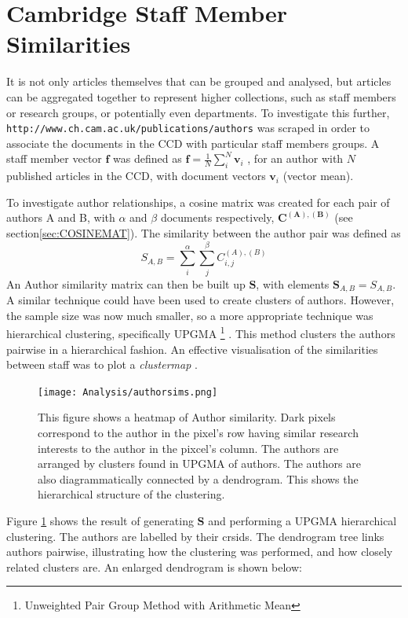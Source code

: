 \section{Cambridge Staff Member Similarities}
It is not only articles themselves that can be grouped and analysed, but articles can be aggregated together to represent higher collections, such as staff members or research groups, or potentially even departments. 
To investigate this further, \texttt{http://www.ch.cam.ac.uk/publications/authors} was scraped in order to associate the documents in the CCD with particular staff members groups. A staff member vector $\textbf{f}$ was defined as $\mathbf{f}=\frac{1}{N}\sum_{i}^{N} \mathbf{v}_i$ , for an author with $N$ published articles in the CCD, with document vectors $\mathbf{v}_i$ (vector mean).

To investigate author relationships, a cosine matrix was created for each pair of authors A and B, with $\alpha$ and $\beta$ documents respectively, $\mathbf{C^{\left( A \right ) , \left( B \right)}}$ (see section\ref{sec:COSINEMAT}). The similarity between the author pair was defined as 
$$S_{A , B} = \sum_{i}^{\alpha} \sum_{j}^{\beta} C^{\left( A \right) , \left( B \right) }_{ i , j }$$
An Author similarity matrix can then be built up $\mathbf{S}$, with elements $\mathbf{S}_{ A , B }=S_{ A , B }$.
A similar technique could have been used to create clusters of authors. However, the sample size was now much smaller, so a more appropriate technique was hierarchical clustering, specifically UPGMA \footnote{Unweighted Pair Group Method with Arithmetic Mean} \cite{heatmapcluster}. This method clusters the authors pairwise in a hierarchical fashion.  An effective visualisation of the similarities between staff was to plot a \emph{clustermap} \cite{seaborn} \cite{scipy}.
\begin{center}
\begin{figure}[H]
\label{fig:AUTHORSIMS}
  \centering
    \texttt{[image: Analysis/authorsims.png]}
    \caption{This figure shows a heatmap of Author similarity. Dark pixels correspond to the author in the pixel's row having similar research interests to the author in the pixcel's column. The authors are arranged by clusters found in UPGMA of authors. The authors are also diagrammatically connected by a dendrogram. This shows the hierarchical structure of the clustering.}
\end{figure} 
\end{center}
Figure \ref{fig:AUTHORSIMS} shows the result of generating $\textbf{S}$ and performing a UPGMA hierarchical clustering. The authors are labelled by their crsids. The dendrogram tree links authors pairwise, illustrating how the clustering was performed, and how closely related clusters are. An enlarged dendrogram is shown below:
